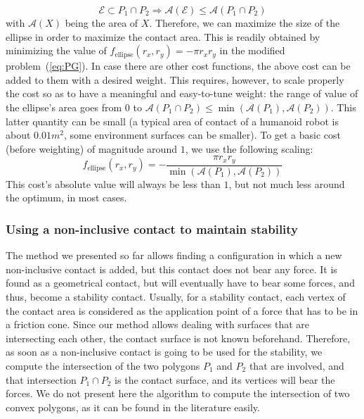 \begin{equation}
\mathcal{E} \subset P_1 \cap P_2 \Longrightarrow  \mathcal{A}(\mathcal{E}) \le \mathcal{A}(P_1 \cap P_2)
\end{equation}
with $\mathcal{A}(X)$ being the area of $X$.\newline
Therefore, we can maximize the size of the ellipse in order to maximize the contact area.
This is readily obtained by minimizing the value of $f_{\text{ellipse}}(r_x, r_y) = -\pi r_x r_y$ in the modified problem~(\ref{eq:PG}).
In case there are other cost functions, the above cost can be added to them with a desired weight.
This requires, however, to scale properly the cost so as to have a meaningful and easy-to-tune weight: the range of value of the ellipse's area goes from $0$ to $\mathcal{A}(P_1 \cap P_2) \leq \min (\mathcal{A}(P_1), \mathcal{A}(P_2))$.
This latter quantity can be small (a typical area of contact of a humanoid robot is about $0.01m^2$, some environment surfaces can be smaller).
To get a basic cost (before weighting) of magnitude around $1$, we use the following scaling:
\begin{equation}
f_\text{ellipse}(r_x, r_y) = - \frac{\pi r_x r_y}{\min (\mathcal{A}(P_1), \mathcal{A}(P_2))}
\label{eq:cost-ellipse}
\end{equation}
This cost's absolute value will always be less than $1$, but not much less around the optimum, in most cases.


\subsubsection{Using a non-inclusive contact to maintain stability}
\label{subsubsec:stability}


The method we presented so far allows finding a configuration in which a new non-inclusive contact is added, but this contact does not bear any force.
It is found as a geometrical contact, but will eventually have to bear some forces, and thus, become a stability contact.
Usually, for a stability contact, each vertex of the contact area is considered as the application point of a force that has to be in a friction cone.
Since our method allows dealing with surfaces that are intersecting each other, the contact surface is not known beforehand.
Therefore, as soon as a non-inclusive contact is going to be used for the stability, we compute the intersection of the two polygons $P_1$ and $P_2$ that are involved, and that intersection $P_1 \cap P_2$ is the contact surface, and its vertices will bear the forces.
We do not present here the algorithm to compute the intersection of two convex polygons, as it can be found in the literature easily.

